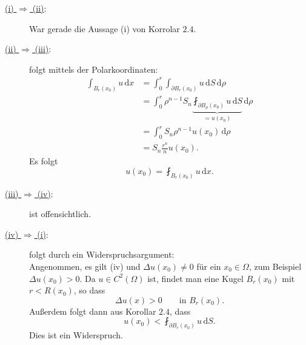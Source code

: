 \begin{beweis}
	\begin{description}
		\item[\underline{(i) $\Rightarrow$ (ii)}:] War gerade die Aussage (i) von Korrolar $2.4$.
		\item[\underline{(ii) $\Rightarrow$ (iii)}:] folgt mittels der Polarkoordinaten:
		\begin{align*}
			\int_{B_r(x_0)}^{}u \,\mathrm{d}x &= \int_{0}^{r} \int_{\partial B_r(x_0)}^{} u \,\mathrm{d}S \,\mathrm{d}\rho  \\
			&= \int_{0}^{r} \rho^{n-1}S_n \underset{=u(x_0)}{\underbrace{\fint_{\partial B_{\rho}(x_0)}^{} u \,\mathrm{d}S}} \,\mathrm{d} \rho \\
			&= \int_{0}^{r}S_n \rho^{n-1} u(x_0)\,\mathrm{d}\rho \\
			&= S_n \frac{r^n}{n} u(x_0).
		\end{align*}
		Es folgt \[
			u(x_0) = \fint_{B_r(x_0)}^{} u \,\mathrm{d}x.
		\]
		\item[\underline{(iii) $\Rightarrow$ (iv)}:] ist offensichtlich.
		\item[\underline{(iv) $\Rightarrow$ (i)}:] folgt durch ein Widerspruchsargument: \\
		Angenommen, es gilt (iv) und $\Delta u(x_0) \neq 0$ für ein $x_0 \in \Omega$, zum Beispiel $ \Delta u(x_0) > 0$. 
		Da $u \in C^2(\Omega)$ ist, findet man eine Kugel $B_r(x_0)$ mit $r < R(x_0)$, so dass
		\[
			\Delta u(x) > 0 \qquad \text{in } B_r(x_0).
		\]
		Außerdem folgt dann aus Korollar $2.4$, dass 
		\[
			u(x_0)< \fint_{\partial B_r(x_0)}^{} u \,\mathrm{d}S.
		\]
		Dies ist ein Widerspruch.
	\end{description}
\end{beweis}

